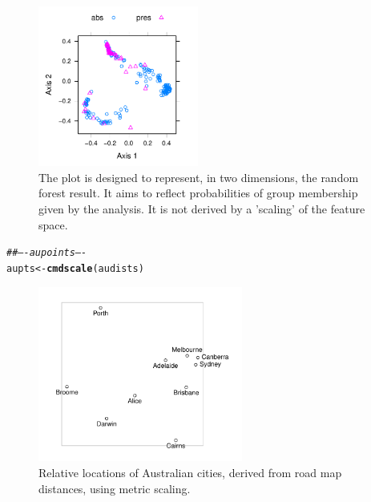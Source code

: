 \documentclass[12pt, a4paper,  BCOR=8.25mm, DIV=15]{scrartcl}\usepackage[]{graphicx}\usepackage[]{color}
\makeatletter
\newcommand{\hlcom}[1]{\textcolor[rgb]{0.678,0.584,0.686}{\textit{#1}}}%
\newcommand{\hlstd}[1]{\textcolor[rgb]{0.345,0.345,0.345}{#1}}%
\newcommand{\hlkwb}[1]{\textcolor[rgb]{0.69,0.353,0.396}{#1}}%
\newcommand{\hlkwd}[1]{\textcolor[rgb]{0.737,0.353,0.396}{\textbf{#1}}}%
\newenvironment{kframe}{%
 \def\at@end@of@kframe{}%
 \ifinner\ifhmode%
  \def\at@end@of@kframe{\end{minipage}}%
  \begin{minipage}{\columnwidth}%
 \fi\fi%
 \def\FrameCommand##1{\hskip\@totalleftmargin \hskip-\fboxsep
 \colorbox{shadecolor}{##1}\hskip-\fboxsep
     \hskip-\linewidth \hskip-\@totalleftmargin \hskip\columnwidth}%
 \MakeFramed {\advance\hsize-\width
   \@totalleftmargin\z@ \linewidth\hsize
   \@setminipage}}%
 {\par\unskip\endMakeFramed%
 \at@end@of@kframe}
\newenvironment{knitrout}{}{} %
\makeatother
\begin{document}
\begin{figure}
\begin{knitrout}
\color{fgcolor}

{\centering \includegraphics[width=0.47\textwidth]{figs/xmeth-proximity-plot-1} 

}



\end{knitrout}
\caption{The plot is designed to represent, in two dimensions, the random
  forest result. It aims to reflect probabilities of group membership
  given by the analysis.  It is not derived by a 'scaling' of the
  feature space.
}\label{fig:rfbronchit}
\end{figure}

\begin{knitrout}
\color{fgcolor}\begin{kframe}
\begin{alltt}
\hlcom{## ---- aupoints ----}
\hlstd{aupts} \hlkwb{<-} \hlkwd{cmdscale}\hlstd{(audists)}
\end{alltt}
\end{kframe}
\end{knitrout}

\begin{figure}
\begin{knitrout}
\color{fgcolor}

{\centering \includegraphics[width=0.6\textwidth]{figs/xmeth-aupoints_12_16-1} 

}



\end{knitrout}
\caption{Relative locations of Australian cities, derived from road
  map distances, using metric scaling.\label{fig:audists}}
\end{figure}
\end{document}
